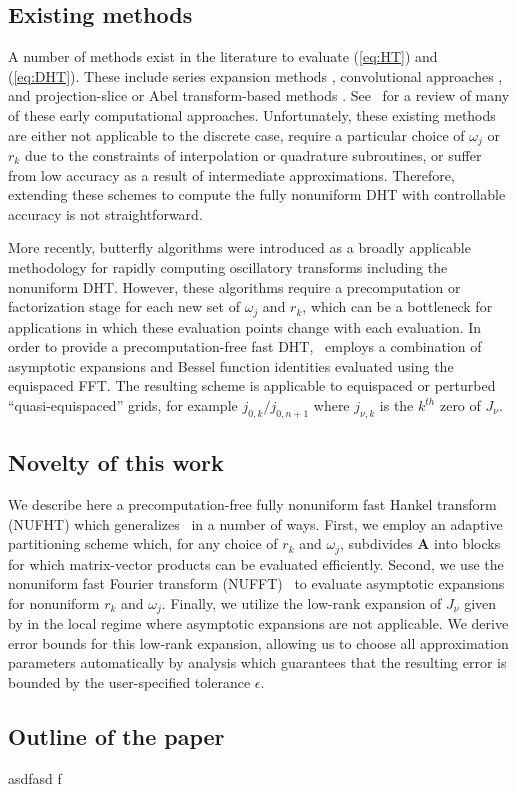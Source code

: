 \subsection*{Existing methods}
A number of methods exist in the literature to evaluate (\ref{eq:HT}) and
(\ref{eq:DHT}). These include series expansion methods
\cite{lord1954b,brunol1977fourier,cavanagh1979numerical},
convolutional approaches \cite{siegman1977quasi, johansen1979fast,
mook1983algorithm, liu1999nonuniform}, and projection-slice or Abel transform-based methods
\cite{oppenheim1980computation, hansen1985fast, kapur1995algorithm}.
See~\cite{cree1993algorithms} for a review of many of these early computational
approaches. Unfortunately, these existing methods are either not applicable to
the discrete case, require a particular choice of $\omega_j$ or $r_k$ due to the
constraints of interpolation or quadrature subroutines, or suffer from low
accuracy as a result of intermediate approximations. Therefore, extending these
schemes to compute the fully nonuniform DHT with controllable accuracy is not
straightforward.

More recently, butterfly algorithms \cite{oneil2010algorithm, li2015butterfly,
  pang2020interpolative} were introduced as a broadly applicable methodology for
rapidly computing oscillatory transforms including the nonuniform DHT. However,
these algorithms require a precomputation or factorization stage for each new
set of $\omega_j$ and $r_k$, which can be a bottleneck for applications in which
these evaluation points change with each evaluation. In order to provide a
precomputation-free fast DHT,~\cite{townsend2015fast} employs a combination of
asymptotic expansions and Bessel function identities evaluated using the
equispaced FFT. The resulting scheme is applicable to equispaced or perturbed
``quasi-equispaced'' grids, for example $j_{0,k} / j_{0,n+1}$ where $j_{\nu,k}$
is the $k^{th}$ zero of $J_\nu$.


\subsection*{Novelty of this work}


We describe here a precomputation-free fully nonuniform fast Hankel transform
(NUFHT) which generalizes~\cite{townsend2015fast} in a number of ways. First, we
employ an adaptive partitioning scheme which, for any choice of $r_k$ and
$\omega_j$, subdivides $\bm{A}$ into blocks for which matrix-vector products can
be evaluated efficiently. Second, we use the nonuniform fast Fourier transform
(NUFFT)~\cite{dutt1993fast, greengard2004accelerating} to evaluate asymptotic
expansions for nonuniform $r_k$ and $\omega_j$. Finally, we utilize the low-rank
expansion of $J_\nu$ given by \cite{wimp1962polynomial} in the local regime
where asymptotic expansions are not applicable. We derive error bounds for this
low-rank expansion, allowing us to choose all approximation parameters
automatically by analysis which guarantees that the resulting error is bounded
by the user-specified tolerance $\epsilon$.



\subsection*{Outline of the paper}

asdfasd
f

